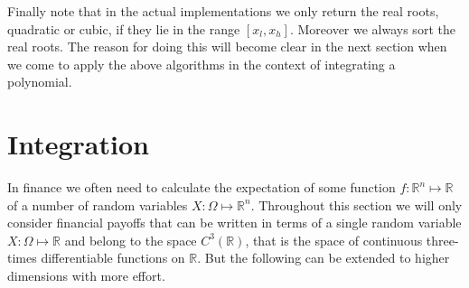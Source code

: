 Finally note that in the actual implementations we only return the
real roots, quadratic or cubic, if they lie in the range $\left[x_l,
x_h\right]$. Moreover we always sort the real roots. The reason for
doing this will become clear in the next section when we come to apply
the above algorithms in the context of integrating a polynomial.

\section{Integration}
In finance we often need to calculate the expectation of some function
$f: \mathbb R^n \mapsto \mathbb R$ of a number of random variables $X:
\Omega \mapsto \mathbb R^n$. Throughout this section we will only
consider financial payoffs that can be written in terms of a single
random variable $X: \Omega \mapsto \mathbb R$ and belong to the space
$C^3(\mathbb R)$, that is the space of continuous three-times
differentiable functions on $\mathbb R$. But the following can be
extended to higher dimensions with more effort.

